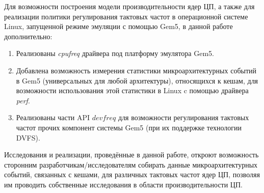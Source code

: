     Для возможности построения модели производительности ядер ЦП, а также для реализации политики
    регулирования тактовых частот в операционной системе Linux, запущенной режиме эмуляции с
    помощью Gem5, в данной работе дополнительно:
    \begin{enumerate}
        \item Реализованы \textit{cpufreq} драйвера под платформу эмулятора Gem5.
        \item Добавлена возможность измерения статистики микроархитектурных событий в Gem5
        (универсальных для любой архитектуры), относящихся к кешам, для возможности использования
        этой статистики в Linux c помощью драйвера \textit{perf}.
        \item Реализованы части API $devfreq$ для возможности регулирования
        тактовых частот прочих компонент системы Gem5 (при их поддержке технологии DVFS).
    \end{enumerate}

    Исследования и реализации, проведённые в данной работе, откроют возможность сторонним
    разработчикам/исследователям собирать данные микроархитектурных событий, связанных с кешами,
    для различных тактовых частот ядер ЦП, позволяя им проводить собственные исследования в области
    производительности ЦП.

\newpage
